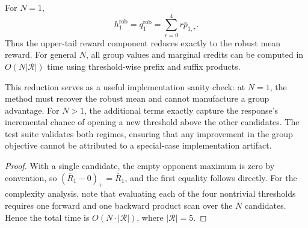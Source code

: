 \begin{proposition}[\(N=1\) reduction and complexity]
\label{cor:n1-reduction}
For \(N=1\),
\[
h_1^{\mathrm{rob}} = q_1^{\mathrm{rob}} = \sum_{r=0}^{4} r \overline p_{1,r}.
\]
Thus the upper-tail reward component reduces exactly to the robust mean reward. For general \(N\), all group values and marginal credits can be computed in \(O(N|\mathcal R|)\) time using threshold-wise prefix and suffix products.
\end{proposition}

This reduction serves as a useful implementation sanity check: at \(N=1\), the method must recover the robust mean and cannot manufacture a group advantage. For \(N>1\), the additional terms exactly capture the response's incremental chance of opening a new threshold above the other candidates. The test suite validates both regimes, ensuring that any improvement in the group objective cannot be attributed to a special-case implementation artifact.

\begin{proof}
With a single candidate, the empty opponent maximum is zero by convention, so \((\overline R_1 - 0)_+ = \overline R_1\), and the first equality follows directly. For the complexity analysis, note that evaluating each of the four nontrivial thresholds requires one forward and one backward product scan over the \(N\) candidates. Hence the total time is \(O(N \cdot |\mathcal R|)\), where \(|\mathcal R| = 5\).
\end{proof}

